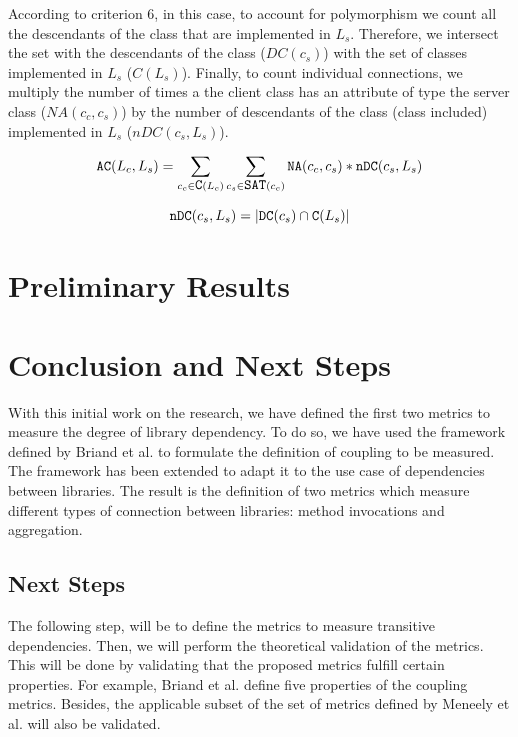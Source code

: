 \documentclass[a4paper]{article}
\begin{document}
According to criterion 6, in this case, to account for polymorphism we count all the descendants of the class that are implemented in $L_s$. Therefore, we intersect the set with the descendants of the class ($DC(c_s)$) with the set of classes implemented in $L_s$ ($C(L_s)$). Finally, to count individual connections, we multiply the number of times a the client class has an attribute of type the server class ($NA(c_c, c_s)$) by the number of descendants of the class (class included) implemented in $L_s$ ($nDC(c_s,L_s)$).

\begin{equation}
  \verb|AC|(L_c,L_s) = \sum_{c_c \in \verb|C|(L_c)} \sum_{c_s \in \verb|SAT|(c_c)} \verb|NA|(c_c, c_s)*\verb|nDC|(c_s, L_s)
\end{equation}

\begin{equation}
    \verb|nDC|(c_s, L_s) = |\verb|DC|(c_s) \cap \verb|C|(L_s)|
\end{equation}

\section{Preliminary Results}



\section{Conclusion and Next Steps}
With this initial work on the research, we have defined the first two metrics to measure the degree of library dependency. To do so, we have used the framework defined by Briand et al. to formulate the definition of coupling to be measured. The framework has been extended to adapt it to the use case of dependencies between libraries. The result is the definition of two metrics which measure different types of connection between libraries: method invocations and aggregation.


\subsection{Next Steps}
The following step, will be to define the metrics to measure transitive dependencies. Then, we will perform the theoretical validation of the metrics. This will be done by validating that the proposed metrics fulfill certain properties. For example, Briand et al. \cite{briand1999unified} define five properties of the coupling metrics. Besides, the applicable subset of the set of metrics defined by Meneely et al. \cite{meneely2013validating} will also be validated.
\end{document}
